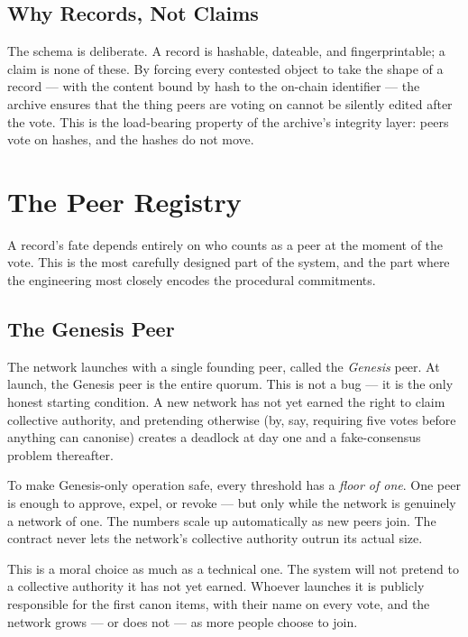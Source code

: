 \documentclass[11pt,a4paper]{article}
\begin{document}
\subsection{Why Records, Not Claims}

The schema is deliberate. A record is hashable, dateable, and
fingerprintable; a claim is none of these. By forcing every
contested object to take the shape of a record --- with the
content bound by hash to the on-chain identifier --- the
archive ensures that the thing peers are voting on cannot be
silently edited after the vote. This is the load-bearing
property of the archive's integrity layer: peers vote on
hashes, and the hashes do not move.

\section{The Peer Registry}

A record's fate depends entirely on who counts as a peer at the
moment of the vote. This is the most carefully designed part of
the system, and the part where the engineering most closely
encodes the procedural commitments.

\subsection{The Genesis Peer}

The network launches with a single founding peer, called the
\emph{Genesis} peer. At launch, the Genesis peer is the entire
quorum. This is not a bug --- it is the only honest starting
condition. A new network has not yet earned the right to claim
collective authority, and pretending otherwise (by, say,
requiring five votes before anything can canonise) creates a
deadlock at day one and a fake-consensus problem thereafter.

To make Genesis-only operation safe, every threshold has a
\emph{floor of one}. One peer is enough to approve, expel, or
revoke --- but only while the network is genuinely a network of
one. The numbers scale up automatically as new peers join. The
contract never lets the network's collective authority outrun
its actual size.

This is a moral choice as much as a technical one. The system
will not pretend to a collective authority it has not yet
earned. Whoever launches it is publicly responsible for the
first canon items, with their name on every vote, and the
network grows --- or does not --- as more people choose to
join.
\end{document}
